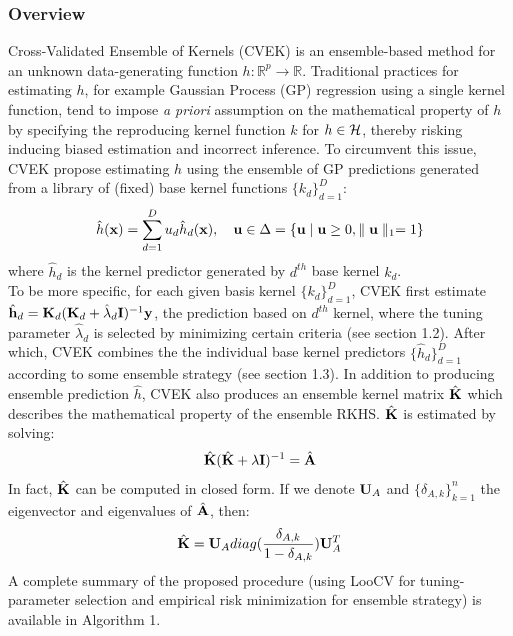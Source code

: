 \documentclass[11pt]{article}
\begin{document}
\subsubsection{{Overview}}
Cross-Validated Ensemble of Kernels (CVEK) \citep{liu_robust_2017} is an ensemble-based method for an unknown data-generating function $h: \mathbb{R}^p\rightarrow \mathbb{R}$. Traditional practices for estimating $h$, for example  Gaussian Process (GP) regression using a single kernel function, tend to impose \textit{a priori} assumption on the mathematical property of $h$ by specifying the reproducing kernel function $k$ for $h \in {\cal H}$, thereby risking inducing biased estimation and incorrect inference. To circumvent this issue, CVEK propose estimating $h$ using the ensemble of GP predictions generated from a library of (fixed) base kernel functions $\{k_d\}_{d=1}^D$:
\begin{align}
\hat{h}({\bf x})=\sum_{d=1}^D u_d\hat{h}_d({\bf x}), \quad {\bf u} \in \Delta=\{{\bf u} \mid {\bf u} \geq 0, \parallel {\bf u} \parallel_1=1\}
\end{align}
where $\hat{h}_d$ is the kernel predictor generated by $d^{th}$ base kernel $k_d$.\\
To be more specific, for each given basis kernel $\{k_d\}_{d=1}^D$, CVEK first estimate $\hat{{\bf h}}_d={\bf K}_d({\bf K}_d+\hat{\lambda}_d{\bf I})^{-1}{\bf y}$, the prediction based on $d^{th}$ kernel, where the tuning parameter $\hat{\lambda}_d$ is selected by minimizing certain criteria (see section 1.2). After which, CVEK combines the the individual base kernel predictors $\{\hat{h}_d\}_{d=1}^D$ according to some ensemble strategy (see section 1.3). In addition to producing ensemble prediction $\hat{h}$, CVEK also produces an ensemble kernel matrix $\hat{{\bf K}}$ which describes the mathematical property of the ensemble RKHS. $\hat{{\bf K}}$ is estimated by solving:
\begin{align*}
\hat{{\bf K}}(\hat{{\bf K}}+\lambda {\bf I})^{-1}=\hat{{\bf A}}
\end{align*}
In fact, $\hat{{\bf K}}$ can be computed in closed form. If we denote ${\bf U}_A$ and $\{\delta_{A,k}\}_{k=1}^n$ the eigenvector and eigenvalues of $\hat{{\bf A}}$, then:
\begin{align*}
\hat{{\bf K}}={\bf U}_A diag(\frac{\delta_{A,k}}{1-\delta_{A,k}}){\bf U}_A^T
\end{align*}
A complete summary of the proposed procedure (using LooCV for tuning-parameter selection and empirical risk minimization for ensemble strategy) is available in Algorithm 1.
\end{document}
